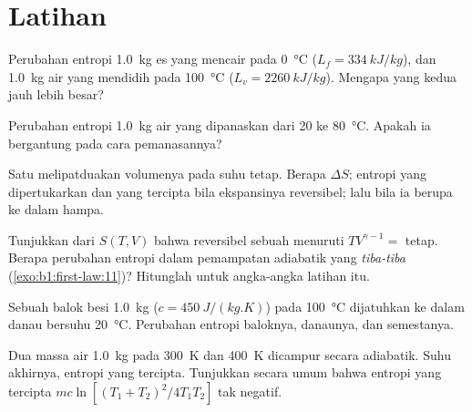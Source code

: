 \section{Latihan}

\begin{exercise}[$\star$]\label{exo:b1:second-law-entropy:1}
Perubahan entropi \qty{1.0}{kg} es yang mencair pada \qty{0}{\degreeCelsius}
($L_f = \qty{334}{kJ/kg}$), dan \qty{1.0}{kg} air yang mendidih pada
\qty{100}{\degreeCelsius} ($L_v = \qty{2260}{kJ/kg}$). Mengapa yang kedua jauh
lebih besar?
\end{exercise}

\begin{exercise}[$\star$]\label{exo:b1:second-law-entropy:2}
Perubahan entropi \qty{1.0}{kg} air yang dipanaskan dari \qty{20}{} ke
\qty{80}{\degreeCelsius}. Apakah ia bergantung pada cara pemanasannya?
\end{exercise}

\begin{exercise}[$\star$]\label{exo:b1:second-law-entropy:3}
Satu   melipatduakan volumenya pada suhu tetap.
Berapa $\Delta S$; entropi yang dipertukarkan dan yang tercipta bila ekspansinya reversibel;
lalu bila ia berupa  ke dalam hampa.
\end{exercise}

\begin{exercise}[$\star$]\label{exo:b1:second-law-entropy:4}
Tunjukkan dari $S(T, V)$ bahwa  reversibel sebuah
 menuruti $TV^{\gamma - 1} =$ tetap. Berapa perubahan entropi dalam
pemampatan adiabatik yang \emph{tiba-tiba} (\cref{exo:b1:first-law:11})?
Hitunglah untuk angka-angka latihan itu.
\end{exercise}

\begin{exercise}[$\star\star$]\label{exo:b1:second-law-entropy:5}
Sebuah balok besi \qty{1.0}{kg} ($c = \qty{450}{J/(kg.K)}$) pada \qty{100}{\degreeCelsius}
dijatuhkan ke dalam danau bersuhu \qty{20}{\degreeCelsius}. Perubahan entropi
baloknya, danaunya, dan semestanya.
\end{exercise}

\begin{exercise}[$\star\star$]\label{exo:b1:second-law-entropy:6}
Dua massa air \qty{1.0}{kg} pada \qty{300}{K} dan \qty{400}{K} dicampur
secara adiabatik. Suhu akhirnya, entropi yang tercipta. Tunjukkan secara umum bahwa
entropi yang tercipta $mc\ln[(T_1 + T_2)^2/4T_1T_2]$ tak negatif.
\end{exercise}

